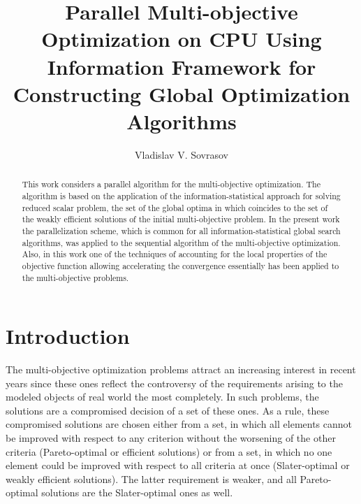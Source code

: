 \documentclass{llncs}
\begin{document}
%
\mainmatter              %
%
\title{Parallel Multi-objective Optimization on CPU Using Information Framework for
Constructing Global Optimization Algorithms}
%
%
\author{Vladislav V. Sovrasov}
%
%
%

\maketitle              %

\begin{abstract}
This work considers a parallel algorithm for the multi-objective optimization. The
algorithm is based on the application of the information-statistical approach for solving
reduced scalar problem, the set of the global optima in which coincides to the set of the
weakly efficient solutions of the initial multi-objective problem. In the present work the parallelization scheme, which is common for all information-statistical global search algorithms,
was applied to the sequential algorithm of the multi-objective optimization. Also, in this
work one of the techniques of accounting for the local properties of the objective function
allowing accelerating the convergence essentially has been applied to the multi-objective
problems.

\end{abstract}
%
\section{Introduction}
The multi-objective optimization problems attract an increasing interest in recent years since
these ones reflect the controversy of the requirements arising to the modeled objects of real
world the most completely. In such problems, the solutions are a compromised decision of a set
of these ones. As a rule, these compromised solutions are chosen either from a set, in which all
elements cannot be improved with respect to any criterion without the worsening of the other
criteria (Pareto-optimal or efficient solutions) or from a set, in which no one element could be
improved with respect to all criteria at once (Slater-optimal or weakly efficient solutions). The
latter requirement is weaker, and all Pareto-optimal solutions are the Slater-optimal ones as
well.
\end{document}
